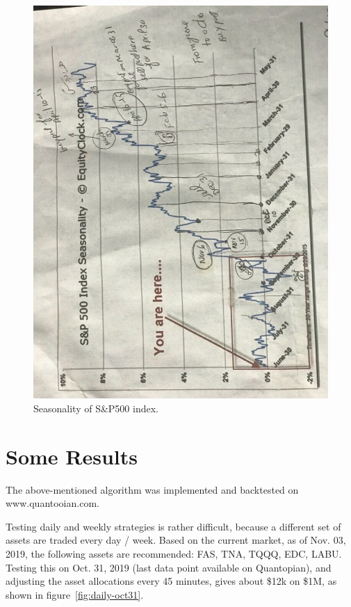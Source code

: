 \documentclass{article}
\begin{document}
\begin{figure}\label{fig:seasonality}
\includegraphics[width = \textwidth, angle = -90 ]{figures/seasonality.JPG}
\caption{Seasonality of S\&P500 index.}
\end{figure}

\newpage

\section{Some Results}

The above-mentioned algorithm was implemented and backtested on www.quantooian.com.

Testing daily and weekly strategies is rather difficult, because a
different set of assets are traded every day / week. Based on the
current market, as of Nov. 03, 2019, the following assets are
recommended: FAS, TNA, TQQQ, EDC, LABU. Testing this on Oct. 31, 2019
(last data point available on Quantopian), and adjusting the asset
allocations every 45 minutes, gives about \$12k on \$1M, as shown in
figure~\ref{fig:daily-oct31}.
\end{document}
